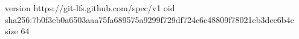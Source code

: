 version https://git-lfs.github.com/spec/v1
oid sha256:7b0f3eb0a6503aaa75fa689575a9299f729df724c6c48809f78021eb3dec6b4c
size 64
